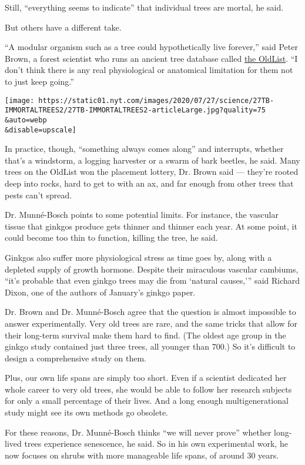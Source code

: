 Still, ``everything seems to indicate'' that individual trees are
mortal, he said.

But others have a different take.

``A modular organism such as a tree could hypothetically live forever,''
said Peter Brown, a forest scientist who runs an ancient tree database
called \href{http://www.rmtrr.org/oldlist.htm}{the OldList}. ``I don't
think there is any real physiological or anatomical limitation for them
not to just keep going.''

\texttt{[image: https://static01.nyt.com/images/2020/07/27/science/27TB-IMMORTALTREES2/27TB-IMMORTALTREES2-articleLarge.jpg?quality=75\\\&auto=webp\\\&disable=upscale]}

In practice, though, ``something always comes along'' and interrupts,
whether that's a windstorm, a logging harvester or a swarm of bark
beetles, he said. Many trees on the OldList won the placement lottery,
Dr. Brown said --- they're rooted deep into rocks, hard to get to with
an ax, and far enough from other trees that pests can't spread.

Dr. Munné-Bosch points to some potential limits. For instance, the
vascular tissue that ginkgos produce gets thinner and thinner each year.
At some point, it could become too thin to function, killing the tree,
he said.

Ginkgos also suffer more physiological stress as time goes by, along
with a depleted supply of growth hormone. Despite their miraculous
vascular cambiums, ``it's probable that even ginkgo trees may die from
`natural causes,''' said Richard Dixon, one of the authors of January's
ginkgo paper.

Dr. Brown and Dr. Munné-Bosch agree that the question is almost
impossible to answer experimentally. Very old trees are rare, and the
same tricks that allow for their long-term survival make them hard to
find. (The oldest age group in the ginkgo study contained just three
trees, all younger than 700.) So it's difficult to design a
comprehensive study on them.

Plus, our own life spans are simply too short. Even if a scientist
dedicated her whole career to very old trees, she would be able to
follow her research subjects for only a small percentage of their lives.
And a long enough multigenerational study might see its own methods go
obsolete.

For these reasons, Dr. Munné-Bosch thinks ``we will never prove''
whether long-lived trees experience senescence, he said. So in his own
experimental work, he now focuses on shrubs with more manageable life
spans, of around 30 years.

